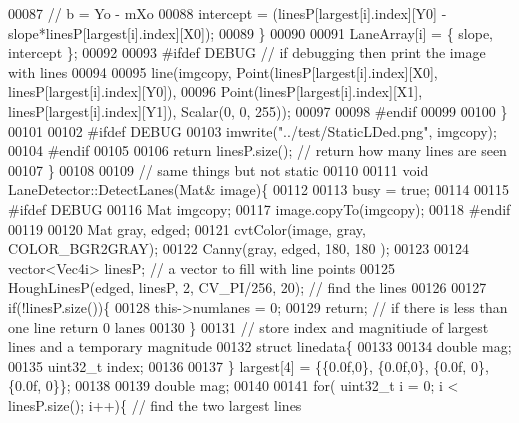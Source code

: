 \begin{DoxyCode}
00087         \textcolor{comment}{// b = Yo - mXo}
00088         intercept = (linesP[largest[i].index][Y0] - slope*linesP[largest[i].index][X0]);
00089         \}
00090 
00091         LaneArray[i] = \{ slope, intercept \};
00092 
00093         \textcolor{preprocessor}{#}\textcolor{preprocessor}{ifdef} \textcolor{preprocessor}{DEBUG} \textcolor{comment}{// if debugging then print the image with lines}
00094 
00095         line(imgcopy, Point(linesP[largest[i].index][X0], linesP[largest[i].index][Y0]),
00096                     Point(linesP[largest[i].index][X1], linesP[largest[i].index][Y1]), Scalar(0, 0, 
      255));
00097 
00098         \textcolor{preprocessor}{#}\textcolor{preprocessor}{endif}
00099 
00100     \}
00101 
00102     \textcolor{preprocessor}{#}\textcolor{preprocessor}{ifdef} \textcolor{preprocessor}{DEBUG}
00103     imwrite(\textcolor{stringliteral}{"../test/StaticLDed.png"}, imgcopy);
00104     \textcolor{preprocessor}{#}\textcolor{preprocessor}{endif}
00105 
00106     \textcolor{keywordflow}{return} linesP.size();  \textcolor{comment}{// return how many lines are seen}
00107 \}
00108 
00109 \textcolor{comment}{// same things but not static}
00110 
00111 \textcolor{keywordtype}{void} LaneDetector::DetectLanes(Mat& image)\{
00112 
00113     busy = \textcolor{keyword}{true};
00114 
00115     \textcolor{preprocessor}{#}\textcolor{preprocessor}{ifdef} \textcolor{preprocessor}{DEBUG}
00116     Mat imgcopy;
00117     image.copyTo(imgcopy);
00118     \textcolor{preprocessor}{#}\textcolor{preprocessor}{endif}
00119 
00120     Mat gray, edged;
00121     cvtColor(image, gray, COLOR\_BGR2GRAY);
00122     Canny(gray, edged, 180, 180 );
00123 
00124     vector<Vec4i> linesP;  \textcolor{comment}{// a vector to fill with line points}
00125     HoughLinesP(edged, linesP, 2, CV\_PI/256, 20);  \textcolor{comment}{// find the lines}
00126 
00127     \textcolor{keywordflow}{if}(!linesP.size())\{
00128         \textcolor{keyword}{this}->numlanes = 0;
00129         \textcolor{keywordflow}{return}; \textcolor{comment}{// if there is less than one line return 0 lanes}
00130     \}
00131     \textcolor{comment}{// store index and magnitiude of largest lines and a temporary magnitude}
00132     \textcolor{keyword}{struct} linedata\{
00133 
00134       \textcolor{keywordtype}{double} mag;
00135       uint32\_t index;
00136 
00137     \} largest[4] = \{\{0.0f,0\}, \{0.0f,0\}, \{0.0f, 0\}, \{0.0f, 0\}\};
00138 
00139     \textcolor{keywordtype}{double} mag;
00140 
00141     \textcolor{keywordflow}{for}( uint32\_t i = 0; i < linesP.size(); i++)\{  \textcolor{comment}{// find the two largest lines}

\end{DoxyCode}

